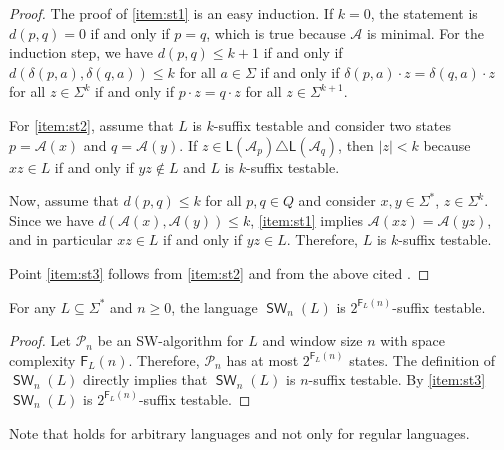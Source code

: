 \documentclass{article}\usepackage[a4paper,margin=20mm]{geometry}
\newcommand{\A}{\mathcal{A}}
\renewcommand{\P}{\mathcal{P}}
\newcommand{\F}{\mathsf{F}}
\renewcommand{\L}{\mathsf{L}}
\DeclareMathOperator{\SW}{\mathsf{SW}}
\renewcommand{\geq}{\geqslant}
\renewcommand{\leq}{\leqslant}
\renewcommand{\ge}{\geq}
\renewcommand{\le}{\leq}
\begin{document}
\begin{proof}
	The proof of \ref{item:st1} is an easy induction.
	If $k=0$, the statement is $d(p,q) = 0$ if and only if $p = q$,
	which is true because $\A$ is minimal. For the induction step, we have
	$d(p,q) \le k+1$ if and only if $d(\delta(p,a),\delta(q,a)) \le k$
	for all $a \in \Sigma$ if and only if $\delta(p,a) \cdot z = \delta(q,a) \cdot z$ for all $z \in \Sigma^{k}$
	if and only if $p \cdot z = q \cdot z$
	for all $z \in \Sigma^{k+1}$.
					
	For \ref{item:st2}, assume that $L$ is $k$-suffix testable and consider two states $p = \A(x)$ and $q= \A(y)$.
	If $z \in \L(\A_p) \triangle \L(\A_q)$, then $|z| < k$ because $xz \in L$ if and only if $yz \notin L$
	and $L$ is $k$-suffix testable.
						
	Now, assume that $d(p,q) \le k$ for all $p,q \in Q$ and consider $x,y \in \Sigma^*$, $z \in \Sigma^k$.
	Since we have $d(\A(x),\A(y)) \le k$, \ref{item:st1} implies $\A(xz) = \A(yz)$, and in particular $xz \in L$ if and only if $yz \in L$.
	Therefore, $L$ is $k$-suffix testable.
						
						
	Point \ref{item:st3} follows from \ref{item:st2} and from the above cited \cite[Lemma~1]{GawrychowskiJ09}.
\end{proof}

\begin{lemma}\label{thm:suffix-language}
	For any $L \subseteq \Sigma^*$ and $n \ge 0$,
	the language $\SW_n(L)$ is $2^{\F_L(n)}$-suffix testable.
\end{lemma}
\begin{proof}
	Let $\P_n$ be an SW-algorithm for $L$ and window size $n$
	with space complexity $\F_L(n)$.
	Therefore, $\P_n$ has at most $2^{\F_L(n)}$ states.
	The definition of $\SW_n(L)$ directly implies that $\SW_n(L)$ is $n$-suffix testable.
	By \ref{item:st3} $\SW_n(L)$ is $2^{\F_L(n)}$-suffix testable.
\end{proof}
Note that  holds for arbitrary languages and not only for regular languages.
\end{document}
